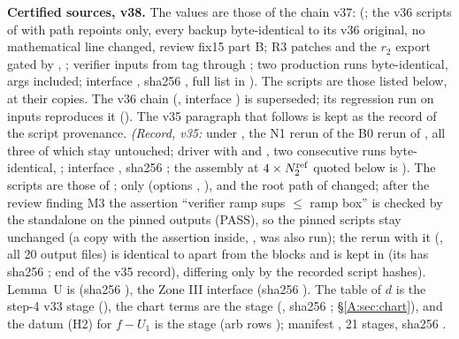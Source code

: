\documentclass[11pt]{article}
\begin{document}
\noindent\textbf{Certified sources, v38.} The values are those of the chain v37:  (; the v36 scripts of  with path repoints only, every  backup byte-identical to its v36 original, no mathematical line changed, review fix15 part B; R3 patches and the $r_2$ export gated by , ; verifier inputs from  tag  through ; two production runs byte-identical, args included; interface , sha256 , full list in ). The scripts are those listed below, at their  copies. The v36 chain (, interface ) is superseded; its regression run on  inputs reproduces it (). The v35 paragraph that follows is kept as the record of the script provenance. \emph{(Record, v35:} under , the N1 rerun of the B0 rerun  of , all three of which stay untouched; driver  with  and , two consecutive runs byte-identical, ; interface , sha256 ; the assembly at $4\times N_2^{\rm ref}$ quoted below is ). The scripts are those of ; only  (options , ),  and the root path of  changed; after the review finding M3 the assertion ``verifier ramp sups $\le$ ramp box'' is checked by the standalone  on the pinned outputs (PASS), so the pinned scripts stay unchanged (a copy with the assertion inside, , was also run); the rerun with it (, all 20 output files) is identical to  apart from the  blocks and is kept in  (its  has sha256 ; end of the v35 record), differing only by the recorded script hashes). Lemma~U is  (sha256 ), the Zone III interface  (sha256 ). The table of $d$ is the step-4 v33 stage  (), the chart terms are the stage  (, sha256 ; \S\ref{A:sec:chart}), and the datum (H2) for $f-U_1$ is the stage  (arb rows ); manifest , 21 stages, sha256 .
\end{document}
